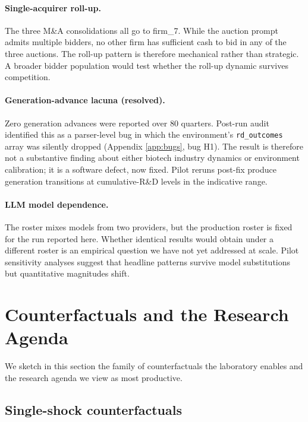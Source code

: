 \documentclass[11pt]{article}
\begin{document}
\paragraph{Single-acquirer roll-up.} The three M\&A consolidations all
go to firm\_7. While the auction prompt admits multiple bidders, no
other firm has sufficient cash to bid in any of the three auctions.
The roll-up pattern is therefore mechanical rather than strategic. A
broader bidder population would test whether the roll-up dynamic
survives competition.

\paragraph{Generation-advance lacuna (resolved).} Zero generation
advances were reported over 80 quarters. Post-run audit identified
this as a parser-level bug in which the environment's
\texttt{rd\_outcomes} array was silently dropped (Appendix
\ref{app:bugs}, bug H1). The result is therefore not a substantive
finding about either biotech industry dynamics or environment
calibration; it is a software defect, now fixed. Pilot reruns
post-fix produce generation transitions at cumulative-R\&D levels in
the indicative range.

\paragraph{LLM model dependence.} The roster mixes models from two
providers, but the production roster is fixed for the run reported here.
Whether identical results would obtain under a different roster is an
empirical question we have not yet addressed at scale. Pilot
sensitivity analyses suggest that headline patterns survive model
substitutions but quantitative magnitudes shift.

\section{Counterfactuals and the Research Agenda}\label{sec:agenda}

We sketch in this section the family of counterfactuals the
laboratory enables and the research agenda we view as most
productive.

\subsection{Single-shock counterfactuals}
\end{document}
